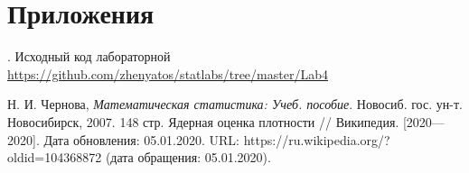 \documentclass[12pt,a4paper]{article}
\begin{document}
\section{Приложения}
. Исходный код лабораторной {\url{https://github.com/zhenyatos/statlabs/tree/master/Lab4}}

\begin{thebibliography}{9} 
	 Н. И. Чернова, \emph{Математическая статистика: Учеб. пособие}. Новосиб. гос. ун-т. Новосибирск, 2007. 148 стр.
	 Ядерная оценка плотности // Википедия. [2020—2020]. Дата обновления: 05.01.2020. URL: https://ru.wikipedia.org/?oldid=104368872 (дата обращения: 05.01.2020).
\end{thebibliography}
\end{document}
